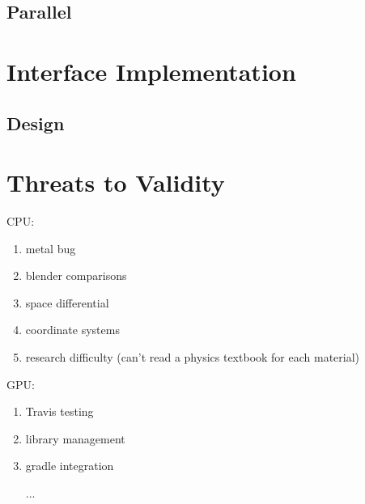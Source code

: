 \subsection{Parallel} \label{ch:methods:renderer:parallel}

 \label{ch:methods:renderer:parallel:motivation}

 \label{ch:methods:renderer:parallel:libraries}

 \label{ch:methods:renderer:parallel:design}

 \label{ch:methods:renderer:parallel:demo}

\section{Interface Implementation} \label{ch:methods:interface}

\subsection{Design} \label{ch:methods:interface:design}

\section{Threats to Validity} \label{ch:methods:threats}

CPU:
\begin{enumerate}
  \item metal bug
  \item blender comparisons
  \item space differential
  \item coordinate systems
  \item research difficulty (can't read a physics textbook for each material)
\end{enumerate}

GPU:
\begin{enumerate}
  \item Travis testing
  \item library management
  \item gradle integration
  \item [...]
\end{enumerate}
